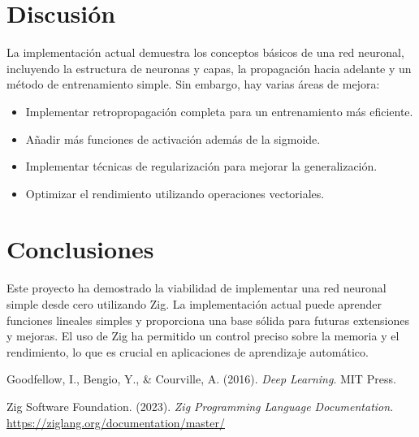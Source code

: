 \documentclass[twocolumn]{article}
\begin{document}
\section{Discusión}
La implementación actual demuestra los conceptos básicos de una red neuronal, incluyendo la estructura de neuronas y capas, la propagación hacia adelante y un método de entrenamiento simple. Sin embargo, hay varias áreas de mejora:

\begin{itemize}
    \item Implementar retropropagación completa para un entrenamiento más eficiente.
    \item Añadir más funciones de activación además de la sigmoide.
    \item Implementar técnicas de regularización para mejorar la generalización.
    \item Optimizar el rendimiento utilizando operaciones vectoriales.
\end{itemize}

\section{Conclusiones}
Este proyecto ha demostrado la viabilidad de implementar una red neuronal simple desde cero utilizando Zig. La implementación actual puede aprender funciones lineales simples y proporciona una base sólida para futuras extensiones y mejoras. El uso de Zig ha permitido un control preciso sobre la memoria y el rendimiento, lo que es crucial en aplicaciones de aprendizaje automático.

\begin{thebibliography}{9}
Goodfellow, I., Bengio, Y., \& Courville, A. (2016). 
\textit{Deep Learning}. 
MIT Press.

Zig Software Foundation. (2023).
\textit{Zig Programming Language Documentation}.
\url{https://ziglang.org/documentation/master/}
\end{thebibliography}
\end{document}
